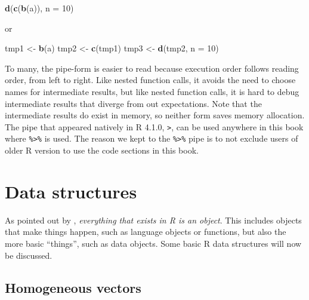\documentclass[]{book}
\newenvironment{Shaded}{\begin{snugshade}}{\end{snugshade}}
\newcommand{\DataTypeTok}[1]{\textcolor[rgb]{0.13,0.29,0.53}{#1}}
\newcommand{\DecValTok}[1]{\textcolor[rgb]{0.00,0.00,0.81}{#1}}
\newcommand{\KeywordTok}[1]{\textcolor[rgb]{0.13,0.29,0.53}{\textbf{#1}}}
\newcommand{\NormalTok}[1]{#1}
\newcommand{\StringTok}[1]{\textcolor[rgb]{0.31,0.60,0.02}{#1}}
\begin{document}
\begin{Shaded}
\begin{Highlighting}[]
\KeywordTok{d}\NormalTok{(}\KeywordTok{c}\NormalTok{(}\KeywordTok{b}\NormalTok{(a)), }\DataTypeTok{n =} \DecValTok{10}\NormalTok{)}
\end{Highlighting}
\end{Shaded}

or

\begin{Shaded}
\begin{Highlighting}[]
\NormalTok{tmp1 <-}\StringTok{ }\KeywordTok{b}\NormalTok{(a)}
\NormalTok{tmp2 <-}\StringTok{ }\KeywordTok{c}\NormalTok{(tmp1)}
\NormalTok{tmp3 <-}\StringTok{ }\KeywordTok{d}\NormalTok{(tmp2, }\DataTypeTok{n =} \DecValTok{10}\NormalTok{)}
\end{Highlighting}
\end{Shaded}

To many, the pipe-form is easier to read because execution order
follows reading order, from left to right. Like nested function
calls, it avoids the need to choose names for intermediate results,
but like nested function calls, it is hard to debug intermediate
results that diverge from out expectations. Note that the
intermediate results do exist in memory, so neither form saves
memory allocation. The pipe that appeared natively in R 4.1.0,
\texttt{\textbar{}\textgreater{}}, can be used anywhere in this book where \texttt{\%\textgreater{}\%} is used. The
reason we kept to the \texttt{\%\textgreater{}\%} pipe is to not exclude users of older
R version to use the code sections in this book.

\hypertarget{data-structures}{%
\section*{Data structures}\label{data-structures}}

As pointed out by \citep{extending}, \emph{everything that exists in R is an
object}. This includes objects that make things happen, such as
language objects or functions, but also the more basic ``things'',
such as data objects. Some basic R data structures will now be
discussed.

\hypertarget{homogeneous-vectors}{%
\subsection*{Homogeneous vectors}\label{homogeneous-vectors}}
\end{document}
